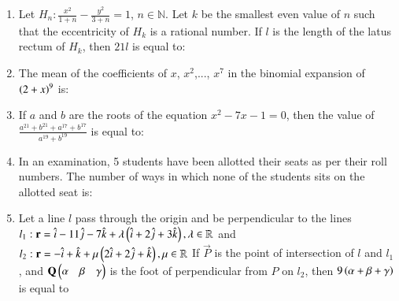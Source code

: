 \documentclass[journal]{IEEEtran}
\begin{document}
\begin{enumerate}
	\item 
	Let $H_n:\frac{x^2}{1+n} - \frac{y^2}{3+n} = 1$, $n \in \mathbb{N}$. Let $k$ be the smallest even value of $n$ such that the eccentricity of $H_k$ is a rational number. If $l$ is the length of the latus rectum of $H_k$, then $21l$ is equal to:

	\item
	The mean of the coefficients of $x$, $x^2$,..., $x^7$ in the binomial expansion of $\left(2 + x\right)^{9}$ is:

	\item
	If $a$ and $b$ are the roots of the equation $x^{2} - 7x - 1 = 0$, then the value of $\frac{a^{21} + b^{21} + a^{17} + b^{17}}{a^{19} + b^{19}}$ is equal to:

	\item
	In an examination, 5 students have been allotted their seats as per their roll numbers. The number of ways in which none of the students sits on the allotted seat is:

	\item
Let a line $l$ pass through the origin and be perpendicular to the lines \\
	$l_1 : \mathbf{r} = \hat{i} - 11\hat{j} - 7\hat{k} + \lambda\left(\hat{i} +2\hat{j} + 3\hat{k}\right), \lambda \in \mathbb{R}$ and \\
	$l_2 : \mathbf{r} = -\hat{i} + \hat{k} + \mu\left(2\hat{i} +2\hat{j} + \hat{k}\right), \mu \in \mathbb{R}$
	If $\vec{P}$ is the point of intersection of $l$ and $l_1$, and $\mathbf{Q} \begin{pmatrix}\alpha & \beta & \gamma\end{pmatrix}$ is the foot of perpendicular from $P$ on $l_2$, then $9\left(\alpha+\beta+\gamma\right)$ is equal to
 \end{enumerate}
 
\end{document}
